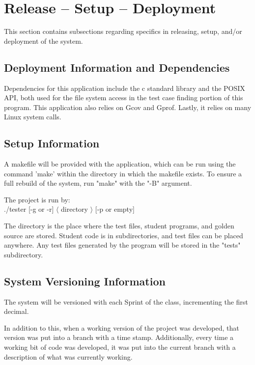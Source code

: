
\chapter{Release -- Setup -- Deployment}
This section contains subsections regarding specifics in releasing, 
setup, and/or deployment of the system. 


\section{Deployment Information and Dependencies}
Dependencies for this application include the c standard library and the POSIX API, both used for the
file system access in the test case finding portion of this program. This application also relies on Gcov and Gprof. Lastly, it relies on many Linux system calls.



\section{Setup Information}
A makefile will be provided with the application, which can be run using the command 'make' within the 
directory in which the makefile exists. To ensure a full rebuild of the system, run "make" with the "-B" argument.

The project is run by: \\
./tester [-g or -r] $\langle$ directory $\rangle$ [-p or empty]

The directory is the place where the test files, student programs, and golden source are stored. Student code is in subdirectories, and test files can be placed anywhere. Any test files generated by the program will be stored in the "tests" subdirectory.


\section{System  Versioning Information}
The system will be versioned with each Sprint of the class, incrementing the first decimal.

In addition to this, when a working version of the project was developed, that version was put into a branch with a time stamp. 
Additionally, every time a working bit of code was developed, it was put into the current branch with 
a description of what was currently working.
